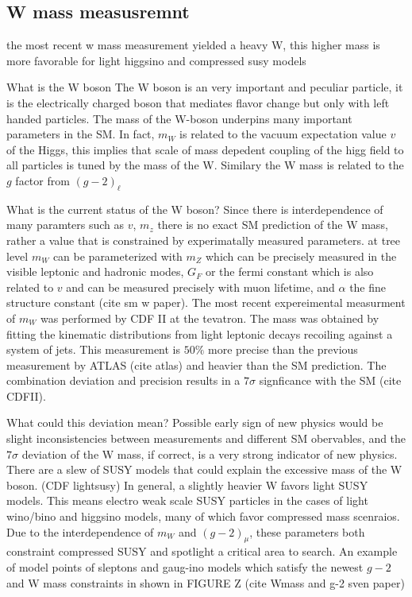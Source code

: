 \subsection{W mass measusremnt}
the most recent w mass measurement yielded a heavy W, this higher mass is more favorable for light higgsino and compressed susy models

What is the W boson
The W boson is an very important and peculiar particle, it is the electrically charged boson that mediates flavor change but only with left handed particles.  The mass of the W-boson underpins many important parameters in the SM. In fact, $m_W$ is related to the vacuum expectation value $v$ of the Higgs, this implies that scale of mass depedent coupling of the higg field to all particles is tuned by the mass of the W. Similary the W mass is related to the $g$ factor from $(g-2)_\ell$ 

What is the current status of the W boson?
Since there is interdependence of many paramters such as $v$, $m_z$ there is no exact SM prediction of the W mass, rather a value that is constrained by experimatally measured parameters. at tree level $m_W$ can be parameterized with $m_Z$ which can be precisely measured in the visible leptonic and hadronic modes, $G_F$ or the fermi constant which is also related to $v$ and can be measured precisely with muon lifetime, and $\alpha$ the fine structure constant (cite sm w paper). The most recent expereimental measurment of $m_W$ was performed by CDF II at the tevatron. The mass was obtained by fitting the kinematic distributions from light leptonic decays recoiling against a system of jets. This measurement is $50\%$ more precise than the previous measurement by ATLAS (cite atlas) and heavier than the SM prediction. The combination deviation and precision results in a $7\sigma$ signficance with the SM (cite CDFII).  


What could this deviation mean?
Possible early sign of new physics would be slight inconsistencies between measurements and different SM obervables, and the $7\sigma$ deviation of the W mass, if correct, is a very strong indicator of new physics. There are a slew of SUSY models that could explain the excessive mass of the W boson. (CDF lightsusy) In general, a slightly heavier W favors light SUSY models. This means electro weak scale SUSY particles in the cases of light wino/bino and higgsino models, many of which favor compressed mass scenraios. Due to the interdependence of $m_W$ and $(g-2)_\mu$, these parameters both constraint compressed SUSY and spotlight a critical area to search. An example of model points of sleptons and gaug-ino models which satisfy the newest $g-2$ and W mass constraints in shown in FIGURE Z (cite Wmass and g-2 sven paper)


